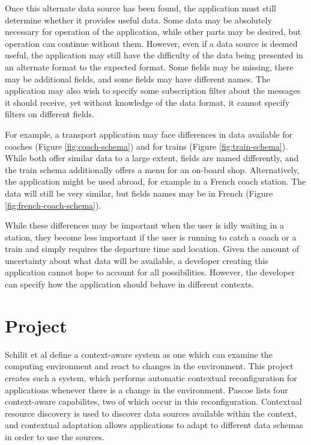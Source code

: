 \documentclass[12pt,twoside,notitlepage]{report}
\begin{document}
Once this alternate data source has been found, the application must still determine whether it provides useful data. 
Some data may be absolutely necessary for operation of the application, while other parts may be desired, but operation can continue without them. 
However, even if a data source is deemed useful, the application may still have the difficulty of the data being presented in an alternate format to the expected format. 
Some fields may be missing, there may be additional fields, and some fields may have different names. 
The application may also wish to specify some subscription filter about the messages it should receive, yet without knowledge of the data format, it cannot specify filters on different fields.

For example, a transport application may face differences in data available for coaches (Figure \ref{fig:coach-schema}) and for trains (Figure \ref{fig:train-schema}). 
While both offer similar data to a large extent, fields are named differently, and the train schema additionally offers a menu for an on-board shop.
Alternatively, the application might be used abroad, for example in a French coach station. The data will still be very similar, but fields names may be in French (Figure \ref{fig:french-coach-schema}).

While these differences may be important when the user is idly waiting in a station, they become less important if the user is running to catch a coach or a train and simply requires the departure time and location.
Given the amount of uncertainty about what data will be available, a developer creating this application cannot hope to account for all possibilities. 
However, the developer can specify how the application should behave in different contexts.

\section{Project}

Schilit et al \cite{Schilit:1994:CCA:1439278.1440041}  define a context-aware system as one which can examine the computing environment and react to changes in the environment. 
This project creates such a system, which performs automatic contextual reconfiguration for applications whenever there is a change in the environment. 
Pascoe \cite{Pascoe:1998:AGC:857199.858020} lists four context-aware capabilites, two of which occur in this reconfiguration. 
Contextual resource discovery is used to discover data sources available within the context, and contextual adaptation allows applications to adapt to different data schemas in order to use the sources.
\end{document}
